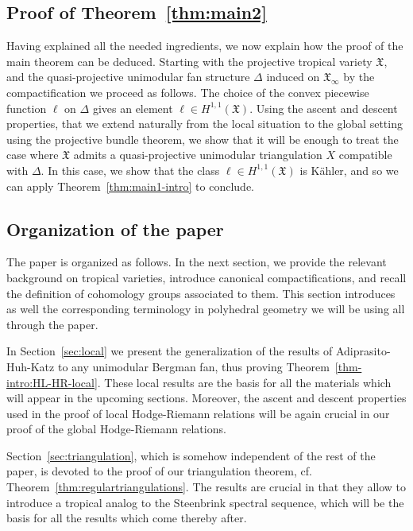 \documentclass[11pt]{amsart}
\theoremstyle{definition}
\numberwithin{equation}{section}
\renewcommand{\~}{\widetilde}
\newcommand{\X}{\mathfrak X}
\begin{document}
\subsection{Proof of Theorem~\ref{thm:main2}}\label{sec:skecth_intro}
Having explained all the needed ingredients, we now explain how the proof of the main theorem can be deduced. Starting with the projective tropical variety $\X$, and the quasi-projective unimodular fan structure $\Delta$ induced on $\X_\infty$ by the compactification we proceed as follows. The choice of the convex piecewise function $\ell$ on $\Delta$ gives an element $\ell \in H^{1,1}(\X)$. Using the ascent and descent properties, that we extend naturally from the local situation to the global setting using the projective bundle theorem, we show that it will be enough to treat the case where $\X$ admits a quasi-projective unimodular triangulation $X$ compatible with $\Delta$.  In this case, we show that the class $\ell \in H^{1,1}(\X)$ is K\"ahler, and so we can apply Theorem~\ref{thm:main1-intro} to conclude.



\subsection{Organization of the paper} The paper is organized as follows. In the next section, we provide the relevant background on tropical varieties, introduce canonical compactifications, and recall the definition of cohomology groups associated to them. This section introduces as well the corresponding terminology in polyhedral geometry we will be using all through the paper.

In Section~\ref{sec:local} we present the generalization of the results of Adiprasito-Huh-Katz to any unimodular Bergman fan, thus proving Theorem~\ref{thm-intro:HL-HR-local}. These local results are the basis for all the materials which will appear in the upcoming sections. Moreover, the ascent and descent properties used in the proof of local Hodge-Riemann relations will be again crucial in our proof of the global Hodge-Riemann relations.

Section~\ref{sec:triangulation}, which is somehow independent of the rest of the paper, is devoted to the proof of our triangulation theorem, cf. Theorem~\ref{thm:regulartriangulations}. The results are crucial in that they allow to introduce a tropical analog to the Steenbrink spectral sequence, which will be the basis for all the results which come thereby after.
\end{document}
